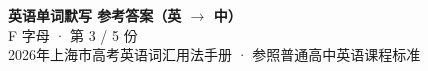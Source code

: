 \documentclass[10pt,a4paper]{article}
\begin{document}
\pagestyle{plain}

\begin{center}
{\LARGE\bfseries 英语单词默写 \quad 参考答案（英 $\to$ 中）}\\[0.22em]
{\large F 字母 · 第 3 / 5 份}\\[0.18em]
{\small 2026年上海市高考英语词汇用法手册 · 参照普通高中英语课程标准}
\end{center}

\vspace{0.2em}
\noindent{\color{rulegray}\rule{\textwidth}{0.8pt}}

\vspace{0.35em}

\vspace{0.25em}
\renewcommand{\arraystretch}{1.32}
\end{document}

